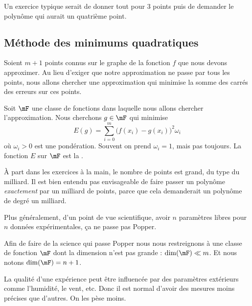 Un exercice typique serait de donner tout pour \( 3\) points puis de demander le polynôme qui aurait un quatrième point.

\subsection{Méthode des minimums quadratiques}

Soient \( m+1\) points connus sur le graphe de la fonction \( f\) que nous devons approximer. Au lieu d'exiger que notre approximation ne passe par tous les points, nous allons chercher une approximation qui minimise la somme des carrés des erreurs sur ces points.

Soit \( \mF\) une classe de fonctions dans laquelle nous allons chercher l'approximation. Nous cherchons \( g\in \mF\) qui minimise
\begin{equation}    \label{EQooJGQVooKwZZVJ}
	E(g)= \sum_{i=0}^m \big( f(x_i)-g(x_i) \big)^2\omega_i
\end{equation}
où \( \omega_i>0\) est une pondération. Souvent on prend \( \omega_i=1\), mais pas toujours. La fonction \( E\) sur \( \mF\) est la .

\begin{normaltext}
	À part dans les exercices à la main, le nombre de points est grand, du type du milliard. Il est bien entendu pas envisageable de faire passer un polynôme \emph{exactement} par un milliard de points, parce que cela demanderait un polynôme de degré un milliard.

	Plus généralement, d'un point de vue scientifique, avoir \( n\) paramètres libres pour \( n\) données expérimentales, ça ne passe pas Popper.

	Afin de faire de la science qui passe Popper nous nous restreignons à une classe de fonction \( \mF\) dont la dimension n'est pas grande : \( \dim( \mF)\ll m\). Et nous notons \( \dim(\mF)=n+1\).
\end{normaltext}

\begin{example}
	La qualité d'une expérience peut être influencée par des paramètres extérieurs comme l'humidité, le vent, etc. Donc il est normal d'avoir des mesures moins précises que d'autres. On les pèse moins.
\end{example}

